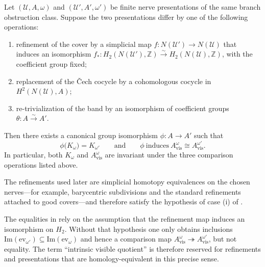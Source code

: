 \begin{proposition}\label{prop:invariance-visible-quotients}
Let $(\mathcal U,A,\omega)$ and $(\mathcal U',A',\omega')$ be finite nerve presentations of the same branch obstruction class. Suppose the two presentations differ by one of the following operations:
\begin{enumerate}[label=(\roman*),nosep]
\item refinement of the cover by a simplicial map $f:N(\mathcal U')\to N(\mathcal U)$ that induces an isomorphism $f_*:H_2(N(\mathcal U'),\mathbb Z)\xrightarrow{\sim} H_2(N(\mathcal U),\mathbb Z)$, with the coefficient group fixed;
\item replacement of the \v{C}ech cocycle by a cohomologous cocycle in $H^2(N(\mathcal U),A)$;
\item re-trivialization of the band by an isomorphism of coefficient groups $\theta:A\xrightarrow{\sim} A'$.
\end{enumerate}
Then there exists a canonical group isomorphism $\phi:A\to A'$ such that
\[
\phi\bigl(K_{\omega}\bigr)=K_{\omega'}
\qquad\text{and}\qquad
\phi\ \text{induces}\ A_{\mathrm{vis}}^{\omega}\cong A_{\mathrm{vis}}^{\omega'}.
\]
In particular, both $K_{\omega}$ and $A_{\mathrm{vis}}^{\omega}$ are invariant under the three comparison operations listed above.
\end{proposition}

\begin{remark}\label{rem:refinement-iso}
The refinements used later are simplicial homotopy equivalences on the chosen nerves---for example, barycentric subdivisions and the standard refinements attached to good covers---and therefore satisfy the hypothesis of case \textup{(i)} of .
\end{remark}

\begin{remark}\label{rem:homology-equality}
The equalities in  rely on the assumption that the refinement map induces an isomorphism on $H_2$. Without that hypothesis one only obtains inclusions $\mathrm{Im}(\mathrm{ev}_{\omega'})\subseteq \mathrm{Im}(\mathrm{ev}_{\omega})$ and hence a comparison map $A_{\mathrm{vis}}^{\omega}\twoheadrightarrow A_{\mathrm{vis}}^{\omega'}$, but not equality. The term ``intrinsic visible quotient'' is therefore reserved for refinements and presentations that are homology-equivalent in this precise sense.
\end{remark}

